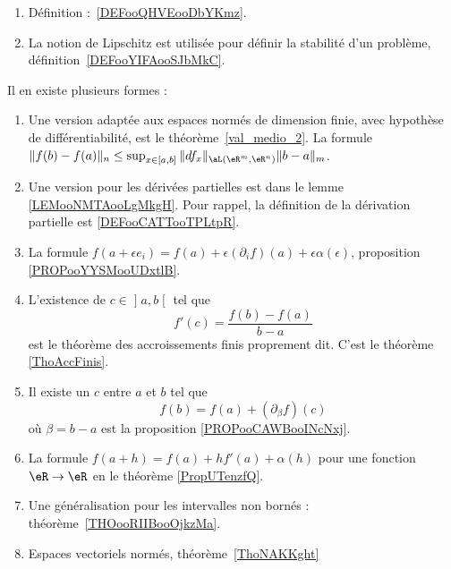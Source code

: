     \begin{enumerate}
    \item
        Définition :~\ref{DEFooQHVEooDbYKmz}.
    \item
        La notion de Lipschitz est utilisée pour définir la stabilité d'un problème, définition~\ref{DEFooYIFAooSJbMkC}.
    \end{enumerate}


            \label{INTERNooXFNTooNNaOzP}
    Il en existe plusieurs formes :
    \begin{enumerate}
        \item
            Une version adaptée aux espaces normés de dimension finie, avec hypothèse de différentiabilité, est le théorème~\ref{val_medio_2}. La formule $\|f(b)-f(a)\|_n\leq \sup_{x\in[a,b]}\|df_x\|_{\aL(\eR^m,\eR^n)}\|b-a\|_m$.
        \item
            Une version pour les dérivées partielles est dans le lemme \ref{LEMooNMTAooLgMkgH}. Pour rappel, la définition de la dérivation partielle est \ref{DEFooCATTooTPLtpR}.
        \item
            La formule \( f(a+\epsilon e_i)=f(a)+\epsilon(\partial_if)(a)+\epsilon\alpha(\epsilon)\), proposition \ref{PROPooYYSMooUDxtlB}.
        \item
        L'existence de \( c\in \mathopen] a , b \mathclose[\) tel que
            \begin{equation}
                f'(c)=\frac{ f(b)-f(a) }{ b-a }
            \end{equation}
            est le théorème des accroissements finis proprement dit. C'est le théorème \ref{ThoAccFinis}.
        \item
            Il existe un \( c\) entre \( a\) et \( b\) tel que
            \begin{equation}
                f(b)=f(a)+(\partial_{\beta}f)(c)
            \end{equation}
            où \( \beta=b-a\) est la proposition \ref{PROPooCAWBooINcNxj}.
        \item
            La formule \( f(a+h)=f(a)+hf'(a)+\alpha(h)\) pour une fonction \( \eR\to \eR\) en le théorème \ref{PropUTenzfQ}.
        \item
            Une généralisation pour les intervalles non bornés : théorème~\ref{THOooRIIBooOjkzMa}.
        \item
            Espaces vectoriels normés, théorème~\ref{ThoNAKKght}
    \end{enumerate}

